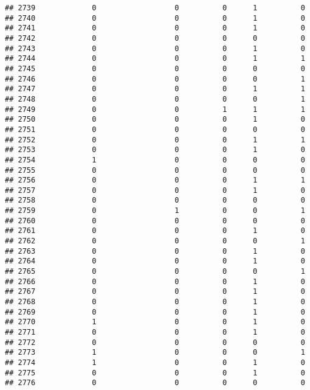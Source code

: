 \documentclass[
]{article}
\begin{document}
\begin{verbatim}
## 2739             0                  0          0      1          0
## 2740             0                  0          0      1          0
## 2741             0                  0          0      1          0
## 2742             0                  0          0      0          0
## 2743             0                  0          0      1          0
## 2744             0                  0          0      1          1
## 2745             0                  0          0      0          0
## 2746             0                  0          0      0          1
## 2747             0                  0          0      1          1
## 2748             0                  0          0      0          1
## 2749             0                  0          1      1          1
## 2750             0                  0          0      1          0
## 2751             0                  0          0      0          0
## 2752             0                  0          0      1          1
## 2753             0                  0          0      1          0
## 2754             1                  0          0      0          0
## 2755             0                  0          0      0          0
## 2756             0                  0          0      1          1
## 2757             0                  0          0      1          0
## 2758             0                  0          0      0          0
## 2759             0                  1          0      0          1
## 2760             0                  0          0      0          0
## 2761             0                  0          0      1          0
## 2762             0                  0          0      0          1
## 2763             0                  0          0      1          0
## 2764             0                  0          0      1          0
## 2765             0                  0          0      0          1
## 2766             0                  0          0      1          0
## 2767             0                  0          0      1          0
## 2768             0                  0          0      1          0
## 2769             0                  0          0      1          0
## 2770             1                  0          0      1          0
## 2771             0                  0          0      1          0
## 2772             0                  0          0      0          0
## 2773             1                  0          0      0          1
## 2774             1                  0          0      1          0
## 2775             0                  0          0      1          0
## 2776             0                  0          0      0          0

\end{verbatim}
\end{document}

